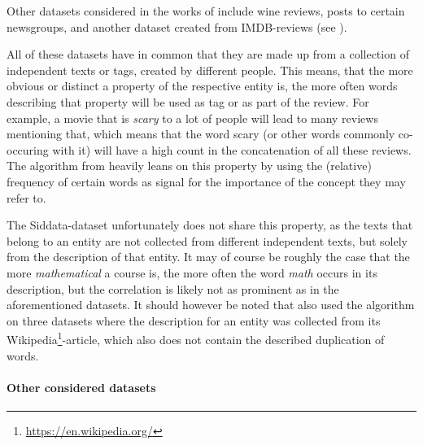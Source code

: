 

Other datasets considered in the works of \mainalgos include wine reviews, posts to certain newsgroups, and another dataset created from IMDB-reviews (see ). 


All of these datasets have in common that they are made up from a collection of independent texts or tags, created by different people. This means, that the more obvious or distinct a property of the respective entity is, the more often words describing that property will be used as tag or as part of the review. For example, a movie that is \emph{scary} to a lot of people will lead to many reviews mentioning that, which means that the word scary (or other words commonly co-occuring with it) will have a high count in the concatenation of all these reviews. The algorithm from \cite{Derrac2015} heavily leans on this property by using the (relative) frequency of certain words as signal for the importance of the concept they may refer to. 

The Siddata-dataset unfortunately does not share this property, as the texts that belong to an entity are not collected from different independent texts, but solely from the description of that entity. It may of course be roughly the case that the more \emph{mathematical} a course is, the more often the word \emph{math} occurs in its description, but the correlation is likely not as prominent as in the aforementioned datasets. It should however be noted that \cite{Alshaikh2020} also used the algorithm on three datasets where the description for an entity was collected from its Wikipedia\footnote{\url{https://en.wikipedia.org/}}-article, which also does not contain the described duplication of words.


\paragraph{Other considered datasets}

